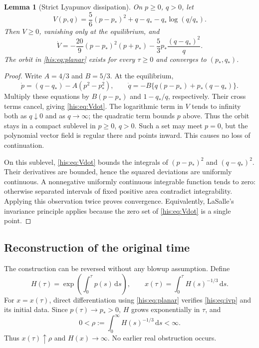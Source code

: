 \documentclass[11pt]{article}
\newtheorem{lemma}[theorem]{Lemma}
\theoremstyle{remark}\newtheorem{remark}[theorem]{Remark}
\newcommand{\dd}{\,\mathrm d}
\numberwithin{equation}{section}
\begin{document}
\begin{lemma}[Strict Lyapunov dissipation]\label{his:lem:lyapunov}
On $p\ge0$, $q>0$, let
\begin{equation}\label{his:eq:V}
 V(p,q)=\frac56(p-p_*)^2+q-q_*-q_*\log(q/q_*).
\end{equation}
Then $V\ge0$, vanishing only at the equilibrium, and
\begin{equation}\label{his:eq:Vdot}
 \dot V=-\frac{20}{9}(p-p_*)^2(p+p_*)
        -\frac53p_*\frac{(q-q_*)^2}{q}.
\end{equation}
The orbit in \eqref{his:eq:planar} exists for every $\tau\ge0$ and converges to $(p_*,q_*)$.
\end{lemma}
\begin{proof}
Write $A=4/3$ and $B=5/3$. At the equilibrium,
\[
 \dot p=(q-q_*)-A(p^2-p_*^2),\qquad
 \dot q=-B\{q(p-p_*)+p_*(q-q_*)\}.
\]
Multiply these equations by $B(p-p_*)$ and $1-q_*/q$, respectively. Their cross terms cancel, giving \eqref{his:eq:Vdot}. The logarithmic term in $V$ tends to infinity both as $q\downarrow0$ and as $q\to\infty$; the quadratic term bounds $p$ above. Thus the orbit stays in a compact sublevel in $p\ge0$, $q>0$. Such a set may meet $p=0$, but the polynomial vector field is regular there and points inward. This causes no loss of continuation.

On this sublevel, \eqref{his:eq:Vdot} bounds the integrals of $(p-p_*)^2$ and $(q-q_*)^2$. Their derivatives are bounded, hence the squared deviations are uniformly continuous. A nonnegative uniformly continuous integrable function tends to zero: otherwise separated intervals of fixed positive area contradict integrability. Applying this observation twice proves convergence. Equivalently, LaSalle's invariance principle applies because the zero set of \eqref{his:eq:Vdot} is a single point.
\end{proof}

\subsection{Reconstruction of the original time}
The construction can be reversed without any blowup assumption. Define
\begin{equation}\label{his:eq:reconstruction}
 H(\tau)=\exp\!\left(\int_0^\tau p(s)\dd s\right),\qquad
 x(\tau)=\int_0^\tau H(s)^{-1/3}\dd s.
\end{equation}
For $x=x(\tau)$, direct differentiation using \eqref{his:eq:planar} verifies \eqref{his:eq:ivp} and its initial data. Since $p(\tau)\to p_*>0$, $H$ grows exponentially in $\tau$, and
\begin{equation}\label{his:eq:rho}
 0<\rho:=\int_0^\infty H(s)^{-1/3}\dd s<\infty.
\end{equation}
Thus $x(\tau)\uparrow\rho$ and $H(x)\to\infty$. No earlier real obstruction occurs.
\end{document}
